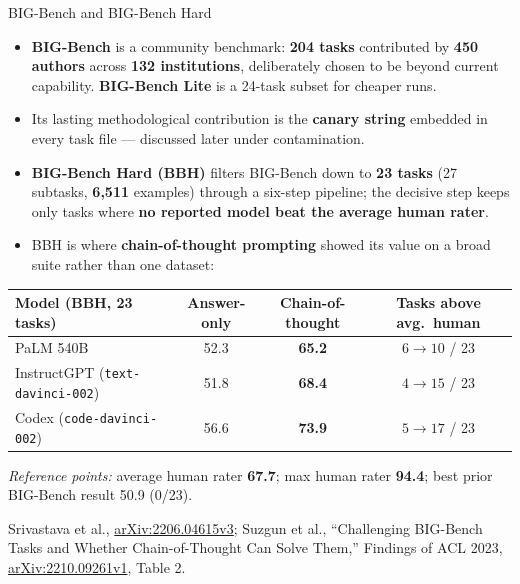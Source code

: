 \begin{frame}{BIG-Bench and BIG-Bench Hard}
  \begin{itemize}\footnotesize\itemsep0.3em
    \item[\textcolor{red}{$\blacktriangleright$}] \textbf{BIG-Bench} is a community benchmark: \textbf{204 tasks} contributed by \textbf{450 authors} across \textbf{132 institutions}, deliberately chosen to be beyond current capability. \textbf{BIG-Bench Lite} is a 24-task subset for cheaper runs.
    \item[\textcolor{red}{$\blacktriangleright$}] Its lasting methodological contribution is the \textbf{canary string} embedded in every task file --- discussed later under contamination.
    \item[\textcolor{red}{$\blacktriangleright$}] \textbf{BIG-Bench Hard (BBH)} filters BIG-Bench down to \textbf{23 tasks} (27 subtasks, \textbf{6{,}511} examples) through a six-step pipeline; the decisive step keeps only tasks where \textbf{no reported model beat the average human rater}.
    \item[\textcolor{red}{$\blacktriangleright$}] BBH is where \textbf{chain-of-thought prompting} showed its value on a broad suite rather than one dataset:
  \end{itemize}
  \vspace{0.15em}
  \centering
  {\footnotesize
  \begin{tabular}{lccc}
    \toprule
    Model (BBH, 23 tasks) & Answer-only & Chain-of-thought & Tasks above avg.\ human \\
    \midrule
    PaLM 540B                     & 52.3 & \textbf{65.2} & $6 \rightarrow 10$ / 23 \\
    InstructGPT (\texttt{text-davinci-002}) & 51.8 & \textbf{68.4} & $4 \rightarrow 15$ / 23 \\
    Codex (\texttt{code-davinci-002})       & 56.6 & \textbf{73.9} & $5 \rightarrow 17$ / 23 \\
    \bottomrule
  \end{tabular}}

  \vspace{0.25em}
  {\footnotesize \textit{Reference points:} average human rater \textbf{67.7}; max human rater \textbf{94.4}; best prior BIG-Bench result 50.9 (0/23).}

  \vspace{0.3em}
  {\scriptsize Srivastava et al., \href{https://arxiv.org/abs/2206.04615v3}{arXiv:2206.04615v3}; Suzgun et al., ``Challenging BIG-Bench Tasks and Whether Chain-of-Thought Can Solve Them,'' Findings of ACL 2023, \href{https://arxiv.org/abs/2210.09261v1}{arXiv:2210.09261v1}, Table 2.}
\end{frame}

